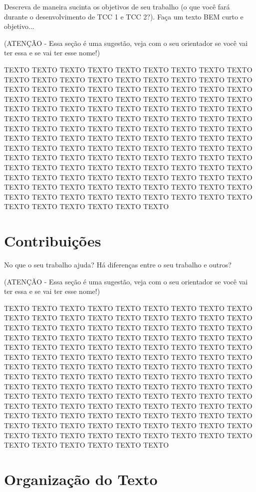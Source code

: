 Descreva de maneira sucinta os objetivos de seu trabalho (o que você fará durante o desenvolvimento de TCC 1 e TCC 2?). Faça um texto BEM curto e objetivo...

(ATENÇÃO - Essa seção é uma sugestão, veja com o seu orientador se você vai ter essa e se vai ter esse nome!)

TEXTO TEXTO TEXTO TEXTO TEXTO TEXTO TEXTO TEXTO TEXTO TEXTO TEXTO TEXTO TEXTO TEXTO TEXTO TEXTO TEXTO TEXTO TEXTO TEXTO TEXTO TEXTO TEXTO TEXTO TEXTO TEXTO TEXTO TEXTO TEXTO TEXTO TEXTO TEXTO TEXTO TEXTO TEXTO TEXTO TEXTO TEXTO TEXTO TEXTO TEXTO TEXTO TEXTO TEXTO TEXTO TEXTO TEXTO TEXTO TEXTO TEXTO TEXTO TEXTO TEXTO TEXTO TEXTO TEXTO TEXTO TEXTO TEXTO TEXTO TEXTO TEXTO TEXTO TEXTO TEXTO TEXTO TEXTO TEXTO TEXTO TEXTO TEXTO TEXTO TEXTO TEXTO TEXTO TEXTO TEXTO TEXTO TEXTO TEXTO TEXTO TEXTO TEXTO TEXTO TEXTO TEXTO TEXTO TEXTO TEXTO TEXTO TEXTO TEXTO TEXTO TEXTO TEXTO TEXTO TEXTO TEXTO TEXTO TEXTO TEXTO TEXTO TEXTO TEXTO TEXTO TEXTO TEXTO TEXTO TEXTO TEXTO TEXTO TEXTO TEXTO TEXTO TEXTO TEXTO TEXTO TEXTO TEXTO TEXTO TEXTO TEXTO TEXTO TEXTO TEXTO TEXTO TEXTO TEXTO TEXTO TEXTO TEXTO TEXTO

\section{Contribuições}
\label{cap:introducao:sec:contribuicoes}

No que o seu trabalho ajuda? Há diferenças entre o seu trabalho e outros?

(ATENÇÃO - Essa seção é uma sugestão, veja com o seu orientador se você vai ter essa e se vai ter esse nome!)

TEXTO TEXTO TEXTO TEXTO TEXTO TEXTO TEXTO TEXTO TEXTO TEXTO TEXTO TEXTO TEXTO TEXTO TEXTO TEXTO TEXTO TEXTO TEXTO TEXTO TEXTO TEXTO TEXTO TEXTO TEXTO TEXTO TEXTO TEXTO TEXTO TEXTO TEXTO TEXTO TEXTO TEXTO TEXTO TEXTO TEXTO TEXTO TEXTO TEXTO TEXTO TEXTO TEXTO TEXTO TEXTO TEXTO TEXTO TEXTO TEXTO TEXTO TEXTO TEXTO TEXTO TEXTO TEXTO TEXTO TEXTO TEXTO TEXTO TEXTO TEXTO TEXTO TEXTO TEXTO TEXTO TEXTO TEXTO TEXTO TEXTO TEXTO TEXTO TEXTO TEXTO TEXTO TEXTO TEXTO TEXTO TEXTO TEXTO TEXTO TEXTO TEXTO TEXTO TEXTO TEXTO TEXTO TEXTO TEXTO TEXTO TEXTO TEXTO TEXTO TEXTO TEXTO TEXTO TEXTO TEXTO TEXTO TEXTO TEXTO TEXTO TEXTO TEXTO TEXTO TEXTO TEXTO TEXTO TEXTO TEXTO TEXTO TEXTO TEXTO TEXTO TEXTO TEXTO TEXTO TEXTO TEXTO TEXTO TEXTO TEXTO TEXTO TEXTO TEXTO TEXTO TEXTO TEXTO TEXTO TEXTO TEXTO TEXTO TEXTO

\section{Organização do Texto}
\label{cap:introducao:sec:organizacao:texto}

